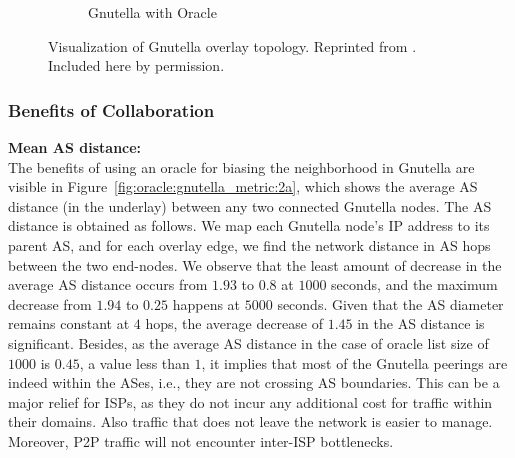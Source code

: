 \begin{figure}[tbp]
\begin{subfigure}[]{0.45\linewidth}
   \caption{Gnutella with Oracle}%
   \end{subfigure}   \caption{Visualization of Gnutella
     overlay topology. Reprinted from \cite{afs-cispp2pcip-ccr07}. Included here by permission.}
   \label{fig:oracle:gnutella_topology}
\end{figure}




\subsubsection{Benefits of Collaboration}\label{sec:Benefits-Collaboration-P2P-results}


\noindent\textbf{Mean AS distance:} \\
The benefits of using an oracle for biasing the neighborhood in Gnutella are visible in
Figure~\ref{fig:oracle:gnutella_metric:2a}, which shows the average AS distance (in the underlay)
between any two connected Gnutella nodes. The AS distance is obtained as follows. We map
each Gnutella node's IP address to its parent AS, and for each overlay edge, we find the
network distance in AS hops between the two end-nodes.  We observe that the least amount
of decrease in the average AS distance occurs from $1.93$ to $0.8$ at $1000$ seconds, and
the maximum decrease from $1.94$ to $0.25$ happens at $5000$ seconds. Given that the AS
diameter remains constant at $4$ hops, the average decrease of $1.45$ in the AS distance
is significant. Besides, as the average AS distance in the case of oracle list size of
$1000$ is $0.45$, a value less than $1$, it implies that most of the Gnutella peerings are
indeed within the ASes, i.e., they are not crossing AS boundaries. This can be a major
relief for ISPs, as they do not incur any additional cost for traffic within their
domains. Also traffic that does not leave the network is easier to manage. Moreover, P2P
traffic will not encounter inter-ISP bottlenecks.


